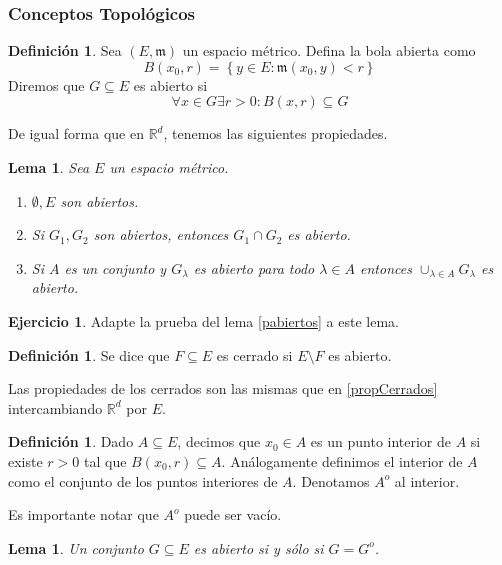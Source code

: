 \documentclass[12pt]{article}
\theoremstyle{plain}
\newtheorem{Lem}[Th]{Lema}             %
\theoremstyle{definition}
\newtheorem{Def}[Th]{Definición}       %
\newtheorem{Ej}[Th]{Ejercicio}
\theoremstyle{remark}
\numberwithin{equation}{section}
\newcommand{\bR}{\mathbb{R}}        %
\newcommand{\mm}{\mathfrak{m}}      %
\renewcommand{\:}{\colon}           %
\newcommand{\conj}[1]{\left\lbrace#1\right\rbrace}
\begin{document}
\begin{multicols}{2}
\begin{ptcb}
\end{ptcb}
\subsubsection*{Conceptos Topológicos}

\begin{Def}
  Sea $(E,\mm)$ un espacio métrico. Defina la bola abierta como
  $$B(x_0,r)=\conj{y\in E\colon\mm(x_0,y)<r}$$
  Diremos que $G\subseteq E$ es abierto si $$\forall x\in G\exists r>0\colon B(x,r)\subseteq G$$
\end{Def}

De igual forma que en $\bR^d$, tenemos las siguientes propiedades.

\begin{Lem}
Sea $E$ un espacio métrico.
  \begin{enumerate}
    \item $\emptyset, E$ son abiertos.
    \item Si $G_1, G_2$ son abiertos, entonces $G_1\cap G_2$ es abierto.
    \item Si $A$ es un conjunto y $G_\lambda$ es abierto para todo $\lambda\in A$ entonces $\cup_{\lambda\in A}G_\lambda$ es abierto.
  \end{enumerate}
\end{Lem}

\begin{Ej}
  Adapte la prueba del lema \ref{pabiertos} a este lema.
\end{Ej}

\begin{Def}
  Se dice que $F\subseteq E$ es cerrado si $E\setminus F$ es abierto.
\end{Def}

Las propiedades de los cerrados son las mismas que en \ref{propCerrados} intercambiando $\bR^d$ por $E$.

\begin{Def}
  Dado $A\subseteq E$, decimos que $x_0\in A$ es un punto interior de $A$ si existe $r>0$ tal que $B(x_0,r)\subseteq A$. Análogamente definimos el interior de $A$ como el conjunto de los puntos interiores de $A$. Denotamos $A^o$ al interior.
\end{Def}

  Es importante notar que $A^o$ puede ser vacío.


\begin{Lem}
  Un conjunto $G\subseteq E$ es abierto si y sólo si $G=G^o$.
\end{Lem}


\end{multicols}
\end{document}
